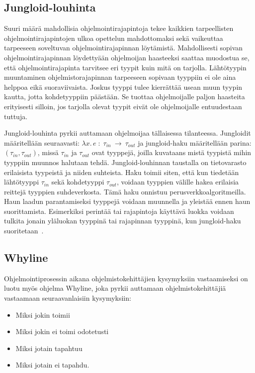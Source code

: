 \documentclass[finnish]{tktltiki2}
\theoremstyle{definition}
\theoremstyle{remark}
\begin{document}
\subsection{Jungloid-louhinta}
Suuri määrä mahdollisia ohjelmointirajapintoja tekee kaikkien tarpeellisten ohjelmointirajapintojen ulkoa opettelun mahdottomaksi sekä vaikeuttaa tarpeeseen soveltuvan ohjelmointirajapinnan löytämistä. Mahdollisesti sopivan ohjelmointirajapinnan löydettyään ohjelmoijan haasteeksi saattaa muodostua se, että ohjelmointirajapinta tarvitsee eri tyypit kuin mitä on tarjolla. Lähtötyypin muuntaminen ohjelmistorajapinnan tarpeeseen sopivaan tyyppiin ei ole aina helppoa eikä suoraviivaista. Joskus tyyppi tulee kierrättää usean muun tyypin kautta, jotta kohdetyyppiin päästään. Se tuottaa ohjelmoijalle paljon haasteita erityisesti silloin, jos tarjolla olevat tyypit eivät ole ohjelmoijalle entuudestaan tuttuja.

Jungloid-louhinta pyrkii auttamaan ohjelmoijaa tällaisessa tilanteessa.
Jungloidit määritellään seuraavasti: $ \lambda x.\, e\; :\; \tau_{in}\:\to\:\tau_{out}$ ja jungloid-haku määritellään parina: $(\tau_{in}, \tau_{out})$, missä $\tau_{in}$ ja $\tau_{out}$ ovat tyyppejä, joilla kuvataans mistä tyypistä mihin tyyppiin muunnos halutaan tehdä. Jungloid-louhinnan taustalla on tietovarasto erilaisista tyypeistä ja niiden suhteista. Haku toimii siten, että kun tiedetään lähtötyyppi $\tau_{in}$ sekä kohdetyyppi $\tau_{out}$, voidaan tyyppien välille hakea erilaisia reittejä tyyppien suhdeverkosta. Tämä haku onnistuu perusverkkoalgoritmeilla. Haun laadun parantamiseksi tyyppejä voidaan muunnella ja yleistää ennen haun suorittamista. Esimerkiksi perintää tai rajapintoja käyttävä luokka voidaan tulkita jonain yläluokan tyyppinä tai rajapinnan tyyppinä, kun jungloid-haku suoritetaan~\cite{jungloid-mining}.
\subsection{Whyline}
Ohjelmointiprosessin aikana ohjelmistokehittäjien kysymyksiin vastaamiseksi on luotu myös ohjelma Whyline, joka pyrkii auttamaan ohjelmistokehittäjiä vastaamaan seuraavanlaisiin kysymyksiin:
\begin{itemize}
  \item Miksi jokin toimii
  \item Miksi jokin ei toimi odotetusti
  \item Miksi jotain tapahtuu
  \item Miksi jotain ei tapahdu.
\end{itemize}
\end{document}
